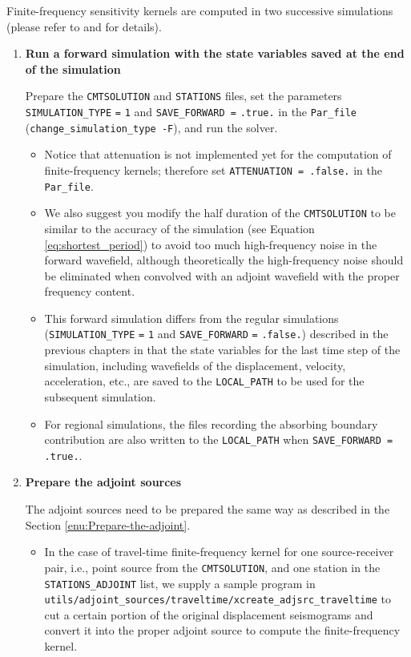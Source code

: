 Finite-frequency sensitivity kernels are computed in two successive
simulations (please refer to \citet{LiTr06} and \citet{TrKoLi08}
for details).
\begin{enumerate}
\item \textbf{Run a forward simulation with the state variables saved at
the end of the simulation}


Prepare the \texttt{\small CMTSOLUTION}{\small{} and }\texttt{\small STATIONS}{\small{}
files, set the parameters }\texttt{\small SIMULATION\_TYPE}{\small {}
}\texttt{\small =}{\small {} }\texttt{\small 1}{\small{} and }\texttt{\small SAVE\_FORWARD
=}{\small {} }\texttt{\small .true.}{\small{} in the }\texttt{\small Par\_file}{\small{}
(}\texttt{\small change\_simulation\_type -F}{\small ), and run the
solver.}{\small \par}
\begin{itemize}
\item Notice that attenuation is not implemented yet for the computation
of finite-frequency kernels; therefore set \texttt{ATTENUATION = .false.}
in the \texttt{Par\_file}.
\item We also suggest you modify the half duration of the \texttt{CMTSOLUTION}
to be similar to the accuracy of the simulation (see Equation \ref{eq:shortest_period})
to avoid too much high-frequency noise in the forward wavefield, although
theoretically the high-frequency noise should be eliminated when convolved
with an adjoint wavefield with the proper frequency content.
\item This forward simulation differs from the regular simulations (\texttt{\small SIMULATION\_TYPE}{\small {}
}\texttt{\small =}{\small {} }\texttt{\small 1}{\small{} and }\texttt{\small SAVE\_FORWARD}{\small {}
}\texttt{\small =}{\small {} }\texttt{\small .false.}{\small ) described
in the previous chapters in that the state variables for the last
time step of the simulation, including wavefields of the displacement,
velocity, acceleration, etc., are saved to the }\texttt{\small LOCAL\_PATH}{\small{}
to be used for the subsequent simulation. }{\small \par}
\item For regional simulations, the files recording the absorbing boundary
contribution are also written to the \texttt{LOCAL\_PATH} when \texttt{SAVE\_FORWARD
= .true.}.
\end{itemize}
\item \textbf{Prepare the adjoint sources}


The adjoint sources need to be prepared the same way as described
in the Section \ref{enu:Prepare-the-adjoint}.
\begin{itemize}
\item In the case of travel-time finite-frequency kernel for one source-receiver
pair, i.e., point source from the \texttt{CMTSOLUTION}, and one station
in the \texttt{STATIONS\_ADJOINT} list, we supply a sample program
in \texttt{utils/adjoint\_sources/traveltime/xcreate\_adjsrc\_traveltime}
to cut a certain portion of the original displacement seismograms
and convert it into the proper adjoint source to compute the finite-frequency
kernel.


\end{itemize}
\end{enumerate}
